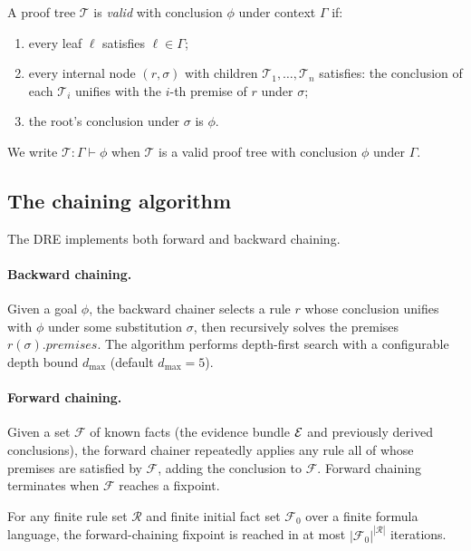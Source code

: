 \documentclass[11pt]{article}
\newcommand{\PTree}{\mathcal{T}}              %
\newcommand{\Prov}[2]{#1 \vdash #2}           %
\begin{document}
\begin{definition}\label{def:valid-tree}
A proof tree $\PTree$ is \emph{valid} with conclusion $\phi$ under
context $\Gamma$ if:
\begin{enumerate}
  \item every leaf $\ell$ satisfies $\ell \in \Gamma$;
  \item every internal node $(r, \sigma)$ with children
        $\PTree_1, \ldots, \PTree_n$ satisfies: the conclusion of each
        $\PTree_i$ unifies with the $i$-th premise of $r$ under $\sigma$;
  \item the root's conclusion under $\sigma$ is $\phi$.
\end{enumerate}
\end{definition}

We write $\PTree : \Prov{\Gamma}{\phi}$ when $\PTree$ is a valid proof
tree with conclusion $\phi$ under $\Gamma$.

\subsection{The chaining algorithm}

The \textsc{DRE} implements both forward and backward chaining.

\paragraph{Backward chaining.}
Given a goal $\phi$, the backward chainer selects a rule $r$ whose
conclusion unifies with $\phi$ under some substitution $\sigma$, then
recursively solves the premises $r(\sigma).\mathit{premises}$.  The
algorithm performs depth-first search with a configurable depth bound
$d_{\max}$ (default $d_{\max} = 5$).

\paragraph{Forward chaining.}
Given a set $\mathcal{F}$ of known facts (the evidence bundle $\mathcal{E}$
and previously derived conclusions), the forward chainer repeatedly
applies any rule all of whose premises are satisfied by $\mathcal{F}$,
adding the conclusion to $\mathcal{F}$.  Forward chaining terminates
when $\mathcal{F}$ reaches a fixpoint.

\begin{proposition}[Termination]\label{prop:termination}
  For any finite rule set $\mathcal{R}$ and finite initial fact set
  $\mathcal{F}_0$ over a finite formula language, the forward-chaining
  fixpoint is reached in at most $|\mathcal{F}_0|^{|\mathcal{R}|}$
  iterations.
\end{proposition}
\end{document}

